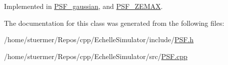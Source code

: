 Implemented in \hyperlink{class_p_s_f__gaussian_a1f19bc740363485cd2e067f9580bafdd}{P\+S\+F\+\_\+gaussian}, and \hyperlink{class_p_s_f___z_e_m_a_x_a2fec338597b88e4f560489e9648649c5}{P\+S\+F\+\_\+\+Z\+E\+M\+AX}.



The documentation for this class was generated from the following files\+:\begin{DoxyCompactItemize}
\item 
/home/stuermer/\+Repos/cpp/\+Echelle\+Simulator/include/\hyperlink{_p_s_f_8h}{P\+S\+F.\+h}\item 
/home/stuermer/\+Repos/cpp/\+Echelle\+Simulator/src/\hyperlink{_p_s_f_8cpp}{P\+S\+F.\+cpp}\end{DoxyCompactItemize}
